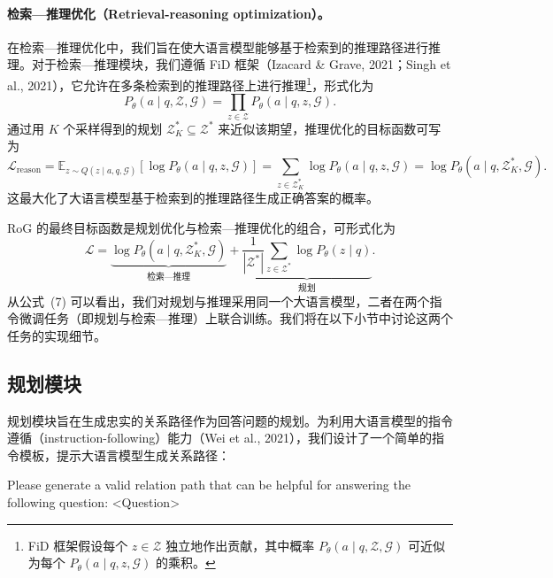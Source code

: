 \documentclass[11pt,UTF8,fontset=fandol]{ctexart}
\begin{document}
\paragraph{检索—推理优化（Retrieval-reasoning optimization）。}
在检索—推理优化中，我们旨在使大语言模型能够基于检索到的推理路径进行推理。对于检索—推理模块，我们遵循 FiD 框架（Izacard \& Grave, 2021；Singh et al., 2021），它允许在多条检索到的推理路径上进行推理\footnote{FiD 框架假设每个 $z \in \mathcal{Z}$ 独立地作出贡献，其中概率 $P_\theta(a \mid q, \mathcal{Z}, \mathcal{G})$ 可近似为每个 $P_\theta(a \mid q, z, \mathcal{G})$ 的乘积。}，形式化为
\begin{equation}
P_\theta(a \mid q, \mathcal{Z}, \mathcal{G}) = \prod_{z \in \mathcal{Z}} P_\theta(a \mid q, z, \mathcal{G}).
\end{equation}
通过用 $K$ 个采样得到的规划 $\mathcal{Z}_K^* \subseteq \mathcal{Z}^*$ 来近似该期望，推理优化的目标函数可写为
\begin{equation}
\mathcal{L}_{\text{reason}} = \mathbb{E}_{z \sim Q(z \mid a, q, \mathcal{G})} \left[ \log P_\theta(a \mid q, z, \mathcal{G}) \right] = \sum_{z \in \mathcal{Z}_K^*} \log P_\theta(a \mid q, z, \mathcal{G}) = \log P_\theta(a \mid q, \mathcal{Z}_K^*, \mathcal{G}).
\end{equation}
这最大化了大语言模型基于检索到的推理路径生成正确答案的概率。

RoG 的最终目标函数是规划优化与检索—推理优化的组合，可形式化为
\begin{equation}
\mathcal{L} = \underbrace{\log P_\theta(a \mid q, \mathcal{Z}_K^*, \mathcal{G})}_{\text{检索—推理}} + \underbrace{\frac{1}{|\mathcal{Z}^*|} \sum_{z \in \mathcal{Z}^*} \log P_\theta(z \mid q)}_{\text{规划}}.
\end{equation}
从公式~(7) 可以看出，我们对规划与推理采用同一个大语言模型，二者在两个指令微调任务（即规划与检索—推理）上联合训练。我们将在以下小节中讨论这两个任务的实现细节。

\subsection{规划模块}

规划模块旨在生成忠实的关系路径作为回答问题的规划。为利用大语言模型的指令遵循（instruction-following）能力（Wei et al., 2021），我们设计了一个简单的指令模板，提示大语言模型生成关系路径：

\begin{promptbox}
Please generate a valid relation path that can be helpful for answering the following question: <Question>
\end{promptbox}
\end{document}
